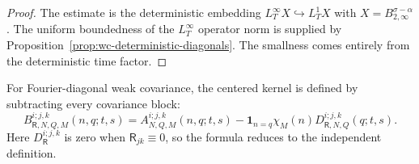 \documentclass[10pt]{amsart}
\numberwithin{equation}{section}
\theoremstyle{plain}
\theoremstyle{definition}
\theoremstyle{remark}
\begin{document}
\begin{proof}
The estimate is the deterministic embedding \(L_T^\infty X\hookrightarrow L_T^1X\) with \(X=B_{2,\infty}^{\sigma-\alpha}\).  The uniform boundedness of the \(L_T^\infty\) operator norm is supplied by Proposition~\ref{prop:wc-deterministic-diagonals}.  The smallness comes entirely from the deterministic time factor.
\end{proof}

For Fourier-diagonal weak covariance, the centered kernel is defined by subtracting every covariance block:
\begin{equation}\label{eq:wc-centered-kernel-def}
B_{\mathsf R,N,Q,M}^{i;j,k}(n,q;t,s)
= A_{N,Q,M}^{i;j,k}(n,q;t,s)
-\mathbf 1_{n=q}\chi_M(n)D_{\mathsf R,N,Q}^{i;j,k}(q;t,s).
\end{equation}
Here \(D_{\mathsf R}^{i;j,k}\) is zero when \(\mathsf R_{jk}\equiv0\), so the formula reduces to the independent definition.
\end{document}
